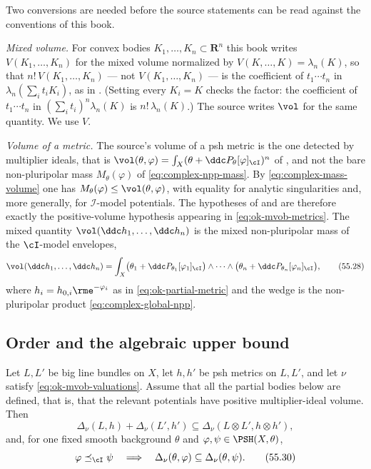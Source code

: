 \begin{remark}
\label{rem:ok-mvob-normalizations}
Two conversions are needed before the source statements can be read against
the conventions of this book.

\emph{Mixed volume.}  For convex bodies $K_1,\dots,K_n\subset\mathbf R^n$
this book writes $V(K_1,\dots,K_n)$ for the mixed volume normalized by
$V(K,\dots,K)=\lambda_n(K)$, so that $n!\,V(K_1,\dots,K_n)$ --- not
$V(K_1,\dots,K_n)$ --- is the coefficient of $t_1\cdots t_n$ in
$\lambda_n(\sum_it_iK_i)$, as in
.  (Setting every $K_i=K$ checks the
factor: the coefficient of $t_1\cdots t_n$ in
$(\sum_it_i)^n\lambda_n(K)$ is $n!\,\lambda_n(K)$.)  The source writes $\vol$ for the
same quantity.  We use $V$.

\emph{Volume of a metric.}  The source's volume of a psh metric is the one
detected by multiplier ideals, that is
$\vol(\theta,\varphi)=\int_X(\theta+\ddc P_\theta[\varphi]_{\cI})^n$ of
, and not the bare non-pluripolar mass
$M_\theta(\varphi)$ of \eqref{eq:complex-npp-mass}.  By
\eqref{eq:complex-mass-volume} one has
$M_\theta(\varphi)\leq\vol(\theta,\varphi)$, with equality for analytic
singularities and, more generally, for $\mathcal I$-model potentials.
The hypotheses of  and
 are therefore exactly the
positive-volume hypothesis appearing in \eqref{eq:ok-mvob-metrics}.  The
mixed quantity $\vol(\ddc h_1,\dots,\ddc h_n)$ is the mixed
non-pluripolar mass of the $\cI$-model envelopes,
\[
 \vol(\ddc h_1,\dots,\ddc h_n)
 =\int_X\bigl(\theta_1+\ddc P_{\theta_1}[\varphi_1]_{\cI}\bigr)
        \wedge\cdots\wedge
        \bigl(\theta_n+\ddc P_{\theta_n}[\varphi_n]_{\cI}\bigr),
\tag{55.28}\label{eq:ok-mvob-mixed-mass}
\]
where $h_i=h_{0,i}\rme^{-\varphi_i}$ as in
\eqref{eq:ok-partial-metric} and the wedge is the non-pluripolar product
\eqref{eq:complex-global-npp}.
\end{remark}

\subsection{Order and the algebraic upper bound}
\label{sec:ok-mixed-upper}

\begin{proposition}
\label{prop:ok-mvob-superadditivity}
Let $L,L'$ be big line bundles on $X$, let $h,h'$ be psh metrics on
$L,L'$, and let $\nu$ satisfy \eqref{eq:ok-mvob-valuations}.  Assume
that all the partial bodies below are defined, that is, that the relevant
potentials have positive multiplier-ideal volume.  Then
\[
 \Delta_\nu(L,h)+\Delta_\nu(L',h')
   \subseteq\Delta_\nu(L\otimes L',h\otimes h'),
\tag{55.29}\label{eq:ok-mvob-superadditivity}
\]
and, for one fixed smooth background $\theta$ and
$\varphi,\psi\in\PSH(X,\theta)$,
\[
 \varphi\preceq_{\cI}\psi
   \quad\Longrightarrow\quad
 \Delta_\nu(\theta,\varphi)\subseteq\Delta_\nu(\theta,\psi).
\tag{55.30}\label{eq:ok-mvob-i-monotone}
\]
\end{proposition}

